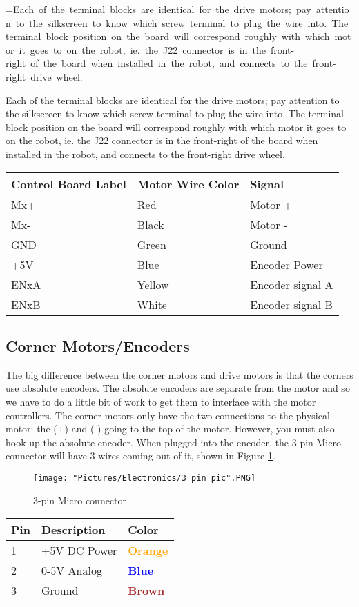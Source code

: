 \documentclass{article}
\makeatletter
\newcommand{\mybox}[1]{%
  \setbox0=\hbox{#1}%
  \setlength{\@tempdima}{\dimexpr\wd0+13pt}%
  \begin{tcolorbox}[colframe=mycolor,boxrule=0.5pt,arc=4pt,
      left=6pt,right=6pt,top=6pt,bottom=6pt,boxsep=0pt,width=0.95\textwidth]
    #1
  \end{tcolorbox}
}
\makeatother
\begin{document}
\mybox{Each of the terminal blocks are identical for the drive motors; pay attention to the silkscreen to know which screw terminal to plug the wire into. The terminal block position on the board will correspond roughly with which motor it goes to on the robot, ie. the J22 connector is in the front-right of the board when installed in the robot, and connects to the front-right drive wheel. }

\begin{tabular}[3] {| l | l | l |}
	\hline
	\textbf{Control Board Label} & \textbf{Motor Wire Color} & \textbf{Signal} \\ \hline
	Mx+ & Red & Motor + \\ \hline
	Mx- & Black & Motor - \\ \hline
	GND & Green & Ground \\ \hline
	+5V & Blue & Encoder Power \\ \hline
	ENxA & Yellow & Encoder signal A \\ \hline
	ENxB & White & Encoder signal B \\ \hline
	\hline
\end{tabular}


\subsection{Corner Motors/Encoders}
The big difference between the corner motors and drive motors is that the corners use absolute encoders. The absolute encoders are separate from the motor and so we have to do a little bit of work to get them to interface with the motor controllers. The corner motors only have the two connections to the physical motor: the (+) and (-) going to the top of the motor. However, you must also hook up the absolute encoder. When plugged into the encoder, the 3-pin Micro connector will have 3 wires coming out of it, shown in Figure \ref{3pin}.

\bigskip 

\begin{figure}[H]
 	\centering
	\texttt{[image: "Pictures/Electronics/3 pin pic".PNG]}
 	\caption{3-pin Micro connector}
	\label{3pin}
\end{figure}

\bigskip
\begin{tabular}[3] {| p{3cm} | p{7cm} | p{3cm} | }
	\hline
	\textbf{Pin} & \textbf{Description} & \textbf{Color} \\ \hline
	1 & +5V DC Power & \textcolor{orange}{\textbf{Orange}} \\ \hline
	2 & 0-5V Analog & \textcolor{blue}{\textbf{Blue}} \\ \hline
	3 & Ground & \textcolor{brown}{\textbf{Brown}} \\ \hline
\end{tabular}
\end{document}
